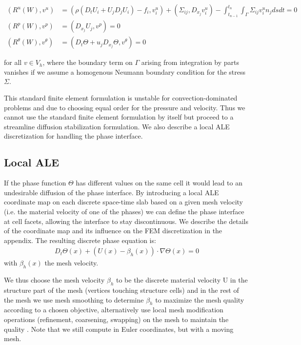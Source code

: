\begin{align*}
  (R^u(W), v^u) &= (\rho(D_t U_i + U_j D_j U_i) - f_i, v^u_i) + (\Sigma_{ij}, D_{x_j} v^u_i) - \int_{t_{n-1}}^{t_n}\int_\Gamma \Sigma_{ij} v^u_i n_j ds dt = 0\\
  (R^p(W), v^p) &= (D_{x_j} U_j, v^p) = 0\\
  (R^\theta(W), v^\theta) &= (D_t \Theta + u_j D_{x_j} \Theta, v^\theta) = 0
\end{align*}

for all $v \in V_h$, where the boundary term on $\Gamma$ arising from
integration by parts vanishes if we assume a homogenous Neumann
boundary condition for the stress $\Sigma$.

This standard finite element formulation is unstable for
convection-dominated problems and due to choosing equal order for the
pressure and velocity. Thus we cannot use the standard finite element
formulation by itself but proceed to a streamline diffusion
stabilization formulation. We also describe a local ALE discretization
for handling the phase interface.

\subsection{Local ALE}

If the phase function $\Theta$ has different values on the same cell
it would lead to an undesirable diffusion of the phase interface. By
introducing a local ALE coordinate map \cite{ereshajo:cde} on each
discrete space-time slab based on a given mesh velocity (i.e. the
material velocity of one of the phases) we can define the phase
interface at cell facets, allowing the interface to stay
discontinuous. We describe the details of the coordinate map and its
influence on the FEM discretization in the appendix. The resulting
discrete phase equation is:
\begin{equation}
\begin{split}\label{eq:ALE}
D_t \Theta(x) +
(U(x) - \beta_h(x)) \cdot \nabla \Theta(x) = 0
\end{split}
\end{equation}
with $\beta_h(x)$ the mesh velocity.

We thus choose the mesh velocity $\beta_h$ to be the discrete material
velocity U in the structure part of the mesh (vertices touching
structure cells) and in the rest of the mesh we use mesh smoothing to
determine $\beta_h$ to maximize the mesh quality according to a chosen
objective, alternatively use local mesh modification operations
(refinement, coarsening, swapping) on the mesh to maintain the quality
\cite{comare:meshadapt}. Note that we still compute in Euler
coordinates, but with a moving mesh.

